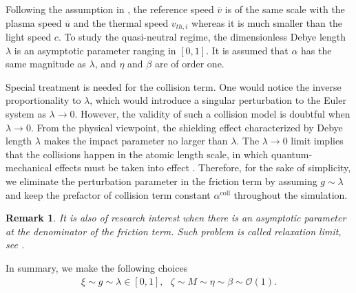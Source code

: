 \documentclass{article}
\newtheorem*{remark}{Remark}
\begin{document}
Following the assumption in \cite{degond_2017}, the reference speed $\overline{v}$ is of the same scale with the plasma speed $\overline{u}$ and the thermal speed $v_{th,i}$ whereas it is much smaller than the light speed $c$. To study the quasi-neutral regime, the dimensionless Debye length $\lambda$ is an asymptotic parameter ranging in $[0,1]$. It is assumed that $\alpha$ has the same magnitude as $\lambda$, and $\eta$ and $\beta$ are of order one. 

Special treatment is needed for the collision term. One would notice the inverse proportionality to $\lambda$, which would introduce a singular perturbation to the Euler system as $\lambda \rightarrow 0$. However, the validity of such a collision model is doubtful when $\lambda \rightarrow 0$. From the physical viewpoint, the shielding effect characterized by Debye length $\lambda$ makes the impact parameter no larger than $\lambda$. The $\lambda \rightarrow 0$ limit implies that the collisions happen in the atomic length scale, in which quantum-mechanical effects must be taken into effect \citep{frank_1972}. Therefore, for the sake of simplicity, we eliminate the perturbation parameter in the friction term by assuming $g \sim \lambda$ and keep the prefactor of collision term constant $\alpha^{\text{coll}}$ throughout the simulation.

\begin{remark}
    It is also of research interest when there is an asymptotic parameter at the denominator of the friction term. Such problem is called relaxation limit, see \cite{peng_2011, wasiolek_2016, Li_2021, Chen_2000}.
\end{remark}

In summary, we make the following choices
\begin{align*}
    \xi \sim g \sim \lambda \in [0,1], \ \ \ \zeta \sim M \sim \eta \sim \beta \sim \mathcal{O}(1).
\end{align*}
\end{document}
